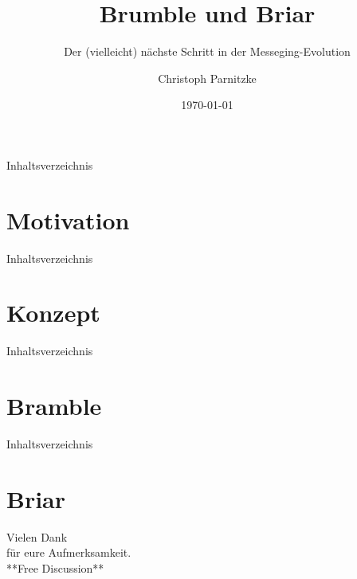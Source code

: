 \documentclass[12pt,utf8]{beamer}
\title{Brumble und Briar}
\subtitle{Der (vielleicht) nächste Schritt in der Messeging-Evolution}
\author[C. Parnitzke]{Christoph Parnitzke}
\institute[FOSS AG - FbI]{Free and Open Source Software AG\\ Fachbereich Informatik}
\date{\today}
\begin{document}
\begin{frame}
	\titlepage
\end{frame}

\begin{frame}[TU]{Inhaltsverzeichnis}
	\tableofcontents[hideallsubsections]
\end{frame}

\section{Motivation}

\begin{frame}{Inhaltsverzeichnis}
\end{frame}




\section{Konzept}

\begin{frame}{Inhaltsverzeichnis}
\end{frame}




\section{Bramble}

\begin{frame}{Inhaltsverzeichnis}
\end{frame}




\section{Briar}




\begin{frame}
\vfill
\begin{center}\begin{Huge}Vielen Dank \\
für eure Aufmerksamkeit. \\[50pt]
**Free Discussion**\end{Huge}\vfill
\end{center}
\vfill
\end{frame}
\end{document}
